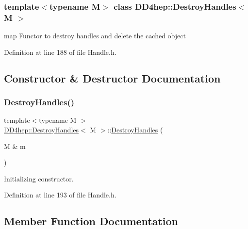 \subsubsection*{template$<$typename M$>$\newline
class D\+D4hep\+::\+Destroy\+Handles$<$ M $>$}

map Functor to destroy handles and delete the cached object 

Definition at line 188 of file Handle.\+h.



\subsection{Constructor \& Destructor Documentation}
\hypertarget{class_d_d4hep_1_1_destroy_handles_a6ea33093d41f7687b16b6cdff8d265f3}{}\label{class_d_d4hep_1_1_destroy_handles_a6ea33093d41f7687b16b6cdff8d265f3} 
\subsubsection{\texorpdfstring{Destroy\+Handles()}{DestroyHandles()}}
{\footnotesize\ttfamily template$<$typename M $>$ \\
\hyperlink{class_d_d4hep_1_1_destroy_handles}{D\+D4hep\+::\+Destroy\+Handles}$<$ M $>$\+::\hyperlink{class_d_d4hep_1_1_destroy_handles}{Destroy\+Handles} (\begin{DoxyParamCaption}\item[{M \&}]{m }\end{DoxyParamCaption})\hspace{0.3cm}{\ttfamily [inline]}}



Initializing constructor. 



Definition at line 193 of file Handle.\+h.



\subsection{Member Function Documentation}
\hypertarget{class_d_d4hep_1_1_destroy_handles_af4b98788f3d66394f5930c97eebe92e5}{}\label{class_d_d4hep_1_1_destroy_handles_af4b98788f3d66394f5930c97eebe92e5} 
